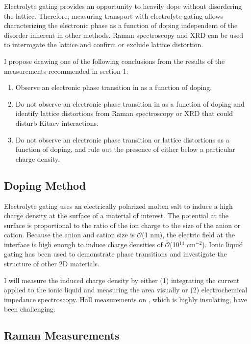 \documentclass[11pt]{article}
\begin{document}
Electrolyte gating provides an opportunity to heavily dope \rucl without disordering the lattice. Therefore, measuring transport with electrolyte gating allows characterizing the electronic phase as a function of doping independent of the disorder inherent in other methods. Raman spectroscopy and XRD can be used to interrogate the lattice and confirm or exclude lattice distortion.

I propose drawing one of the following conclusions from the results of the measurements recommended in section 1:
\begin{enumerate}
	\item Observe an electronic phase transition in \rucl as a function of doping.
	\item Do not observe an electronic phase transition in \rucl as a function of doping and identify lattice distortions from Raman spectroscopy or XRD that could disturb Kitaev interactions.
	\item Do not observe an electronic phase transition or lattice distortions as a function of doping, and rule out the presence of either below a particular charge density.
\end{enumerate}
	

\subsection{Doping Method}

Electrolyte gating uses an electrically polarized molten salt to induce a high charge density at the surface of a material of interest. The potential at the surface is proportional to the ratio of the ion charge to the size of the anion or cation. Because the anion and cation size is $\mathcal{O}$(1 nm), the electric field at the interface is high enough to induce charge densities of $\mathcal{O}$(10$^{14}$ cm$^{-2}$). Ionic liquid gating has been used to demonstrate phase transitions and investigate the structure of other 2D materials\cite{Braga2012,Ueno2008}.

I will measure the induced charge density by either (1) integrating the current applied to the ionic liquid and measuring the area visually or (2) electrochemical impedance spectroscopy. Hall measurements on \ruclnospace, which is highly insulating, have been challenging.

\subsection{Raman Measurements}
\end{document}
